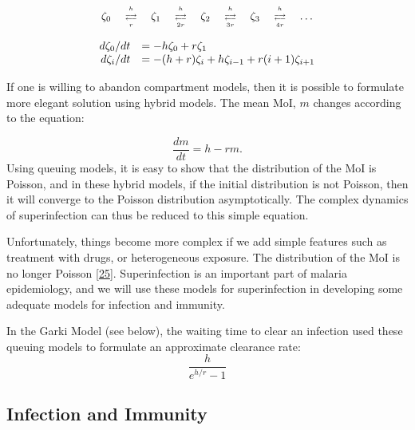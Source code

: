 \documentclass[
]{book}
\begin{document}
\begin{equation*}
\begin{array}{c}
%
\begin{array}{ccccccccc}
\zeta_0 &  {h\atop \longrightarrow} \atop {\longleftarrow \atop r} & \zeta_1  & {h\atop \longrightarrow} \atop {\longleftarrow \atop {2r}} & \zeta_2  & {h \atop \longrightarrow} \atop {\longleftarrow \atop {3r}} & \zeta_3  & {h \atop \longrightarrow} \atop {\longleftarrow \atop {4r}}& \ldots 
\end{array} 
\\ 
\\ 
\begin{array}{rl}
d\zeta_0/dt &= -h \zeta_0 + r \zeta_1 \\ 
d \zeta_i /dt &= -(h+r) \zeta_i + h \zeta_{i-1} + r(i+1) \zeta_{i+1} \\
\end{array} 
\end{array}
\end{equation*}

If one is willing to abandon compartment models, then it is possible to formulate more elegant solution using hybrid models. The mean MoI, \(m\) changes according to the equation:

\[\frac{dm}{dt} = h - r m.\]
Using queuing models, it is easy to show that the distribution of the MoI is Poisson, and in these hybrid models, if the initial distribution is not Poisson, then it will converge to the Poisson distribution asymptotically. The complex dynamics of superinfection can thus be reduced to this simple equation.

Unfortunately, things become more complex if we add simple features such as treatment with drugs, or heterogeneous exposure. The distribution of the MoI is no longer Poisson {[}\protect\hyperlink{ref-HenryJM2020HybridModel}{25}{]}. Superinfection is an important part of malaria epidemiology, and we will use these models for superinfection in developing some adequate models for infection and immunity.

In the Garki Model (see below), the waiting time to clear an infection used these queuing models to formulate an approximate clearance rate: \[ \frac{h}{e^{h/r}-1}\]

\hypertarget{infection-and-immunity}{%
\subsection{Infection and Immunity}\label{infection-and-immunity}}
\end{document}

